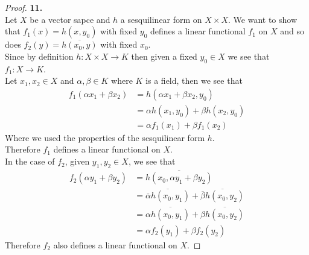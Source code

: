 \documentclass[11pt]{article}
\theoremstyle{definition}
\begin{document}
\cleardoublepage
\begin{proof}{\textbf{11.}}\\
Let $X$ be a vector sapce and $h$ a sesquilinear form on $X \times X$.
We want to show that $f_1(x) = h(x, y_0)$ with fixed $y_0$ defines a linear
functional $f_1$ on $X$ and so does $f_2(y) = \overline{h(x_0, y)}$ with fixed
$x_0$.\\
Since by definition $h: X\times X \to K$ then given a fixed $y_0 \in X$
we see that $f_1: X \to K$.\\
Let $x_1, x_2 \in X$ and $\alpha, \beta \in K$ where $K$ is a field,
then we see that
\begin{align*}
    f_1(\alpha x_1 + \beta x_2)
    &= h(\alpha x_1 + \beta x_2, y_0) \\
    &= \alpha h(x_1, y_0) + \beta h(x_2, y_0) \\
    &= \alpha f_1(x_1) + \beta f_1(x_2)
\end{align*}
Where we used the properties of the sesquilinear form $h$.\\
Therefore $f_1$ defines a linear functional on $X$.\\
In the case of $f_2$, given $y_1, y_2 \in X$, we see that
\begin{align*}
    f_2(\alpha y_1 + \beta y_2)
    &= \overline{h(x_0, \alpha y_1 + \beta y_2)} \\
    &= \overline{\overline{\alpha} h(x_0, y_1)}
    + \overline{\overline{\beta} h(x_0, y_2)} \\
    &= \alpha \overline{h(x_0, y_1)}
    + \beta\overline{h(x_0, y_2)} \\
    &= \alpha f_2(y_1) + \beta f_2(y_2)
\end{align*}
Therefore $f_2$ also defines a linear functional on $X$.
\end{proof}
\end{document}
